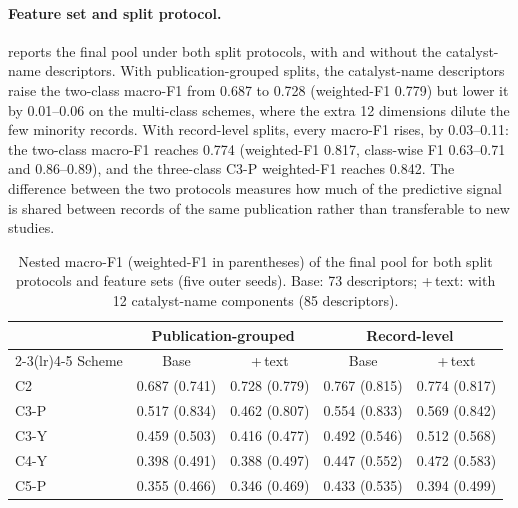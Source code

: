 \documentclass[10pt,a4paper]{article}
\newcommand{\FoneCtwo}{0.687}        \newcommand{\FoneCtwoSD}{0.042}
\newcommand{\FoneCtwoText}{0.728}    \newcommand{\FoneCtwoTextSD}{0.028}
\newcommand{\RecCtwo}{0.774}         \newcommand{\RecCtwoW}{0.817}
\newcommand{\RecCthreePW}{0.842}
\begin{document}
\paragraph{Feature set and split protocol.}  reports
the final pool under both split protocols, with and without the catalyst-name
descriptors. With publication-grouped splits, the catalyst-name descriptors
raise the two-class macro-F1 from \FoneCtwo{} to \FoneCtwoText{}
(weighted-F1 0.779) but lower it by 0.01--0.06 on the multi-class schemes,
where the extra 12 dimensions dilute the few minority records. With
record-level splits, every macro-F1 rises, by 0.03--0.11: the two-class macro-F1
reaches \RecCtwo{} (weighted-F1 \RecCtwoW{}, class-wise F1 0.63--0.71 and
0.86--0.89), and the three-class C3-P weighted-F1 reaches \RecCthreePW{}. The
difference between the two protocols measures how much of the predictive
signal is shared between records of the same publication rather than
transferable to new studies.

\begin{table}[t]
\centering
\caption{Nested macro-F1 (weighted-F1 in parentheses) of the final pool for both
split protocols and feature sets (five outer seeds). Base: 73 descriptors;
+\,text: with 12 catalyst-name components (85 descriptors).}
\label{tab:protocols}
\small
\setlength{\tabcolsep}{4pt}
\begin{tabular}{lcccc}
\toprule
& \multicolumn{2}{c}{Publication-grouped} & \multicolumn{2}{c}{Record-level} \\
\cmidrule(lr){2-3}\cmidrule(lr){4-5}
Scheme & Base & +\,text & Base & +\,text \\
\midrule
C2   & 0.687 (0.741) & 0.728 (0.779) & 0.767 (0.815) & 0.774 (0.817) \\
C3-P & 0.517 (0.834) & 0.462 (0.807) & 0.554 (0.833) & 0.569 (0.842) \\
C3-Y & 0.459 (0.503) & 0.416 (0.477) & 0.492 (0.546) & 0.512 (0.568) \\
C4-Y & 0.398 (0.491) & 0.388 (0.497) & 0.447 (0.552) & 0.472 (0.583) \\
C5-P & 0.355 (0.466) & 0.346 (0.469) & 0.433 (0.535) & 0.394 (0.499) \\
\bottomrule
\end{tabular}
\end{table}
\end{document}
